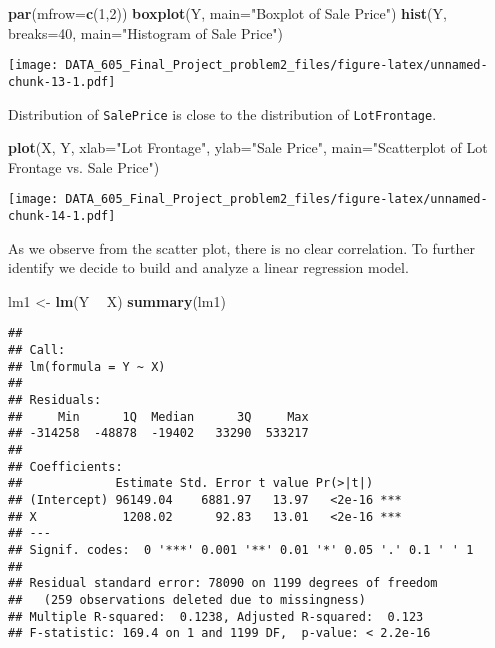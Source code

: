 \documentclass[]{article}
\newenvironment{Shaded}{\begin{snugshade}}{\end{snugshade}}
\newcommand{\DataTypeTok}[1]{\textcolor[rgb]{0.13,0.29,0.53}{#1}}
\newcommand{\DecValTok}[1]{\textcolor[rgb]{0.00,0.00,0.81}{#1}}
\newcommand{\KeywordTok}[1]{\textcolor[rgb]{0.13,0.29,0.53}{\textbf{#1}}}
\newcommand{\NormalTok}[1]{#1}
\newcommand{\OperatorTok}[1]{\textcolor[rgb]{0.81,0.36,0.00}{\textbf{#1}}}
\newcommand{\StringTok}[1]{\textcolor[rgb]{0.31,0.60,0.02}{#1}}
\begin{document}
\begin{Shaded}
\begin{Highlighting}[]
\KeywordTok{par}\NormalTok{(}\DataTypeTok{mfrow=}\KeywordTok{c}\NormalTok{(}\DecValTok{1}\NormalTok{,}\DecValTok{2}\NormalTok{))}
\KeywordTok{boxplot}\NormalTok{(Y, }\DataTypeTok{main=}\StringTok{"Boxplot of Sale Price"}\NormalTok{)}
\KeywordTok{hist}\NormalTok{(Y, }\DataTypeTok{breaks=}\DecValTok{40}\NormalTok{, }\DataTypeTok{main=}\StringTok{"Histogram of Sale Price"}\NormalTok{)}
\end{Highlighting}
\end{Shaded}

\texttt{[image: DATA\_605\_Final\_Project\_problem2\_files/figure-latex/unnamed-chunk-13-1.pdf]}

Distribution of \texttt{SalePrice} is close to the distribution of
\texttt{LotFrontage}.

\begin{Shaded}
\begin{Highlighting}[]
\KeywordTok{plot}\NormalTok{(X, Y, }\DataTypeTok{xlab=}\StringTok{"Lot Frontage"}\NormalTok{, }\DataTypeTok{ylab=}\StringTok{"Sale Price"}\NormalTok{, }
     \DataTypeTok{main=}\StringTok{"Scatterplot of Lot Frontage vs. Sale Price"}\NormalTok{)}
\end{Highlighting}
\end{Shaded}

\texttt{[image: DATA\_605\_Final\_Project\_problem2\_files/figure-latex/unnamed-chunk-14-1.pdf]}

As we observe from the scatter plot, there is no clear correlation. To
further identify we decide to build and analyze a linear regression
model.

\begin{Shaded}
\begin{Highlighting}[]
\NormalTok{lm1 <-}\StringTok{ }\KeywordTok{lm}\NormalTok{(Y }\OperatorTok{~}\StringTok{ }\NormalTok{X)}
\KeywordTok{summary}\NormalTok{(lm1)}
\end{Highlighting}
\end{Shaded}

\begin{verbatim}
## 
## Call:
## lm(formula = Y ~ X)
## 
## Residuals:
##     Min      1Q  Median      3Q     Max 
## -314258  -48878  -19402   33290  533217 
## 
## Coefficients:
##             Estimate Std. Error t value Pr(>|t|)    
## (Intercept) 96149.04    6881.97   13.97   <2e-16 ***
## X            1208.02      92.83   13.01   <2e-16 ***
## ---
## Signif. codes:  0 '***' 0.001 '**' 0.01 '*' 0.05 '.' 0.1 ' ' 1
## 
## Residual standard error: 78090 on 1199 degrees of freedom
##   (259 observations deleted due to missingness)
## Multiple R-squared:  0.1238, Adjusted R-squared:  0.123 
## F-statistic: 169.4 on 1 and 1199 DF,  p-value: < 2.2e-16
\end{verbatim}
\end{document}
